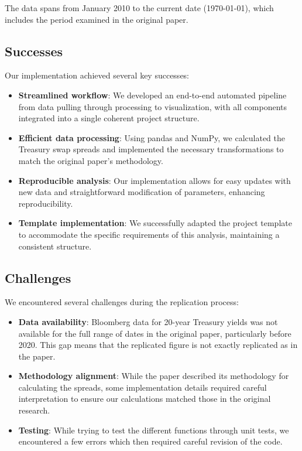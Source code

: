 \documentclass[12pt]{article}
\begin{document}
The data spans from January 2010 to the current date (\today), which includes the period examined in the original paper.

\subsection{Successes}

Our implementation achieved several key successes:

\begin{itemize}
    \item \textbf{Streamlined workflow}: We developed an end-to-end automated pipeline from data pulling through processing to visualization, with all components integrated into a single coherent project structure.
    
    \item \textbf{Efficient data processing}: Using pandas and NumPy, we calculated the Treasury swap spreads and implemented the necessary transformations to match the original paper's methodology.
    
    \item \textbf{Reproducible analysis}: Our implementation allows for easy updates with new data and straightforward modification of parameters, enhancing reproducibility.
    
    \item \textbf{Template implementation}: We successfully adapted the project template to accommodate the specific requirements of this analysis, maintaining a consistent structure.
\end{itemize}

\subsection{Challenges}

We encountered several challenges during the replication process:

\begin{itemize}
    \item \textbf{Data availability}: Bloomberg data for 20-year Treasury yields was not available for the full range of dates in the original paper, particularly before 2020. This gap means that the replicated figure is not exactly replicated as in the paper.
    
    \item \textbf{Methodology alignment}: While the paper described its methodology for calculating the spreads, some implementation details required careful interpretation to ensure our calculations matched those in the original research.
    
    \item \textbf{Testing}: While trying to test the different functions through unit tests, we encountered a few errors which then required careful revision of the code.
\end{itemize}
\end{document}

